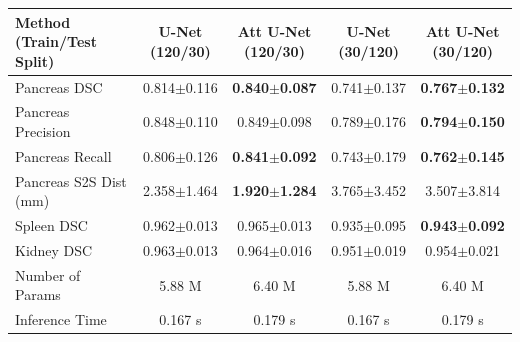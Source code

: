 \documentclass{article}
\begin{document}
\begin{table}[t]\footnotesize
	\parbox{\textwidth}{
		\label{tab:results_attention_1}
		\vspace{2 mm}
		\begin{tabular}{@{\extracolsep{1pt}}lcccc@{}} 
			Method (Train/Test Split) & U-Net (120/30) & Att U-Net (120/30) & U-Net (30/120) & Att U-Net (30/120)\\ \midrule 
			
			Pancreas DSC       &   0.814$\pm$0.116   & \textbf{0.840$\pm$0.087} &  0.741$\pm$0.137 & \textbf{0.767$\pm$0.132} \\
			Pancreas Precision &   0.848$\pm$0.110   & 0.849$\pm$0.098          &  0.789$\pm$0.176 & \textbf{0.794$\pm$0.150} \\
			Pancreas Recall    &   0.806$\pm$0.126   & \textbf{0.841$\pm$0.092} &  0.743$\pm$0.179 & \textbf{0.762$\pm$0.145} \\
			Pancreas S2S Dist (mm) & 2.358$\pm$1.464 & \textbf{1.920$\pm$1.284} &  3.765$\pm$3.452 & 3.507$\pm$3.814 \\ \midrule
			Spleen DSC     &  0.962$\pm$0.013 & 0.965$\pm$0.013 & 0.935$\pm$0.095 & \textbf{0.943$\pm$0.092} \\
			Kidney DSC     &  0.963$\pm$0.013 & 0.964$\pm$0.016 & 0.951$\pm$0.019 & 0.954$\pm$0.021 \\
			Number of Params    &  5.88 M          & 6.40 M          & 5.88 M  & 6.40 M \\
			Inference Time &  0.167 s         & 0.179 s         & 0.167 s & 0.179 s\\ 			\midrule
		\end{tabular}
	}
\end{table}
\end{document}
